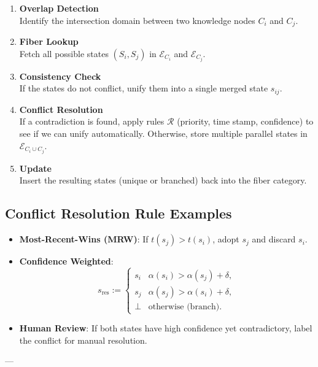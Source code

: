 \documentclass{article}
\begin{document}
\begin{enumerate}
    \item \textbf{Overlap Detection} \\
    Identify the intersection domain between two knowledge nodes \(C_i\) and \(C_j\).

    \item \textbf{Fiber Lookup} \\
    Fetch all possible states \((S_i, S_j)\) in \(\mathcal{E}_{C_i}\) and \(\mathcal{E}_{C_j}\).

    \item \textbf{Consistency Check} \\
    If the states do not conflict, unify them into a single merged state \(s_{ij}\).

    \item \textbf{Conflict Resolution} \\
    If a contradiction is found, apply rules \(\mathcal{R}\) (priority, time stamp, confidence) to see if we can unify automatically. Otherwise, store multiple parallel states in \(\mathcal{E}_{C_i \cup C_j}\).

    \item \textbf{Update} \\
    Insert the resulting states (unique or branched) back into the fiber category.
\end{enumerate}

\subsection{Conflict Resolution Rule Examples}
\begin{itemize}
    \item \textbf{Most-Recent-Wins (MRW)}: If $t(s_j) > t(s_i)$, adopt $s_j$ and discard $s_i$.  
    \item \textbf{Confidence Weighted}:
    \[
       s_{\mathrm{res}} := \begin{cases}
         s_i & \alpha(s_i) > \alpha(s_j) + \delta,\\
         s_j & \alpha(s_j) > \alpha(s_i) + \delta,\\
         \bot & \text{otherwise (branch)}.
       \end{cases}
    \]
    \item \textbf{Human Review}: If both states have high confidence yet contradictory, label the conflict for manual resolution.
\end{itemize}

---
\end{document}

